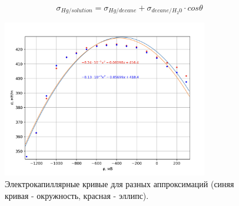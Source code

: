 \documentclass[a4paper,12pt]{article}
\begin{document}
\begin{enumerate}
\[
\sigma_{Hg/solution} = \sigma_{Hg/decane} + \sigma_{decane/H_{2}0}\cdot cos\theta
\]

\begin{figure}[h!]
    \centering
    \includegraphics[width = 0.8\textwidth]{2.11.png}
    \caption{Электрокапиллярные кривые для разных аппроксимаций (синяя кривая - окружность, красная - эллипс).}
    \label{fig:no_int}
\end{figure}\\

\end{enumerate}

\newpage
\end{document}
